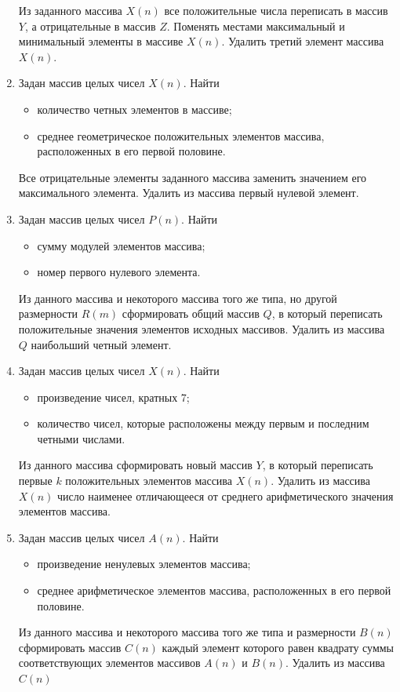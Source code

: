 \begin{enumerate}
Из заданного массива $X(n)$ все положительные числа переписать в массив
$Y$, а отрицательные в массив $Z$. Поменять местами максимальный и минимальный элементы
в массиве $X(n)$. Удалить третий элемент массива $X(n)$.
\item Задан массив целых чисел $X(n)$. Найти
\begin{itemize}
\item количество четных элементов в массиве;
\item среднее геометрическое положительных элементов массива, расположенных в его первой половине.
\end{itemize}
Все отрицательные элементы заданного массива заменить значением его максимального элемента. Удалить из массива
первый нулевой элемент.
\item Задан массив целых чисел $P(n)$. Найти
\begin{itemize}
\item сумму модулей элементов массива;
\item номер первого нулевого элемента.
\end{itemize}
Из данного массива и некоторого массива того же типа, но другой размерности $R(m)$
сформировать общий массив $Q$, в который переписать положительные значения элементов исходных массивов. Удалить
из массива $Q$ наибольший четный элемент.
\item Задан массив целых чисел $X(n)$. Найти
\begin{itemize}
\item произведение чисел, кратных 7;
\item количество чисел, которые расположены между первым и последним четными числами.
\end{itemize}
Из данного массива сформировать новый массив $Y$, в который переписать первые $k$
положительных элементов массива $X(n)$. Удалить из массива $X(n)$
число наименее отличающееся от среднего арифметического значения элементов массива.
\item Задан массив целых чисел $A(n)$. Найти
\begin{itemize}
\item произведение ненулевых элементов массива;
\item среднее арифметическое элементов массива, расположенных в его первой половине.
\end{itemize}
Из данного массива и некоторого массива того же типа и размерности $B(n)$ сформировать
массив $C(n)$ каждый элемент которого равен квадрату суммы соответствующих элементов массивов
$A(n)$ и $B(n)$. Удалить из массива $C(n)$

\end{enumerate}
